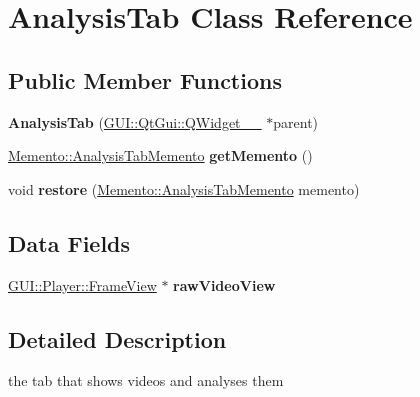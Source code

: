 \hypertarget{classGUI_1_1AnalysisTab}{}\section{Analysis\+Tab Class Reference}
\label{classGUI_1_1AnalysisTab}
\subsection*{Public Member Functions}
\begin{DoxyCompactItemize}
\item 
\hypertarget{classGUI_1_1AnalysisTab_a544106f19b9119dd044e0b351af6b8a0}{}{\bfseries Analysis\+Tab} (\hyperlink{classGUI_1_1QtGui_1_1QWidget____10}{G\+U\+I\+::\+Qt\+Gui\+::\+Q\+Widget\+\_\+\+\_} $\ast$parent)\label{classGUI_1_1AnalysisTab_a544106f19b9119dd044e0b351af6b8a0}

\item 
\hypertarget{classGUI_1_1AnalysisTab_ad452524ed628a2eba1f167f79469b829}{}\hyperlink{classMemento_1_1AnalysisTabMemento}{Memento\+::\+Analysis\+Tab\+Memento} {\bfseries get\+Memento} ()\label{classGUI_1_1AnalysisTab_ad452524ed628a2eba1f167f79469b829}

\item 
\hypertarget{classGUI_1_1AnalysisTab_a37a387e0b6f67a340ff7e60b2f8f7f24}{}void {\bfseries restore} (\hyperlink{classMemento_1_1AnalysisTabMemento}{Memento\+::\+Analysis\+Tab\+Memento} memento)\label{classGUI_1_1AnalysisTab_a37a387e0b6f67a340ff7e60b2f8f7f24}

\end{DoxyCompactItemize}
\subsection*{Data Fields}
\begin{DoxyCompactItemize}
\item 
\hypertarget{classGUI_1_1AnalysisTab_ad1a5ead95d905d9ec387ee6c95665c38}{}\hyperlink{classGUI_1_1Player_1_1FrameView}{G\+U\+I\+::\+Player\+::\+Frame\+View} $\ast$ {\bfseries raw\+Video\+View}\label{classGUI_1_1AnalysisTab_ad1a5ead95d905d9ec387ee6c95665c38}

\end{DoxyCompactItemize}


\subsection{Detailed Description}
the tab that shows videos and analyses them 